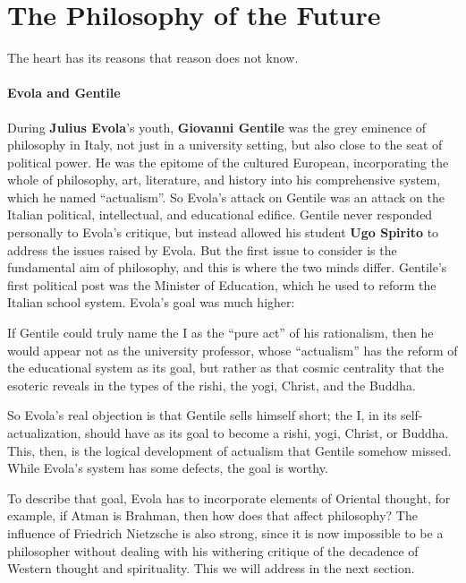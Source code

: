 \section{The Philosophy of the Future}

\begin{quotex}
The heart has its reasons that reason does not know. 
\end{quotex}

\paragraph{Evola and Gentile}
During \textbf{Julius Evola}'s youth, \textbf{Giovanni Gentile} was the grey eminence of philosophy in
Italy, not just in a university setting, but also close to the seat of political power. He was the epitome of the
cultured European, incorporating the whole of philosophy, art, literature, and history into his comprehensive system,
which he named “actualism”. So Evola's attack on Gentile was an attack on the Italian political,
intellectual, and educational edifice. Gentile never responded personally to Evola's critique, but instead
allowed his student \textbf{Ugo Spirito} to address the issues raised by Evola. But the first issue to consider is the
fundamental aim of philosophy, and this is where the two minds differ. Gentile's first political post was
the Minister of Education, which he used to reform the Italian school system. Evola's goal was much higher:

\begin{quotex}
If Gentile could truly name the I as the “pure act” of his rationalism, then he would appear not as the university
professor, whose “actualism” has the reform of the educational system as its goal, but rather as that cosmic centrality
that the esoteric reveals in the types of the rishi, the yogi, Christ, and the Buddha. 

\end{quotex}

So Evola's real objection is that Gentile sells himself short; the I, in its self-actualization, should have
as its goal to become a rishi, yogi, Christ, or Buddha. This, then, is the logical development of actualism that
Gentile somehow missed. While Evola's system has some defects, the goal is worthy.

To describe that goal, Evola has to incorporate elements of Oriental thought, for example, if Atman is Brahman, then how
does that affect philosophy? The influence of Friedrich Nietzsche is also strong, since it is now impossible to be a
philosopher without dealing with his withering critique of the decadence of Western thought and spirituality. This we
will address in the next section.

